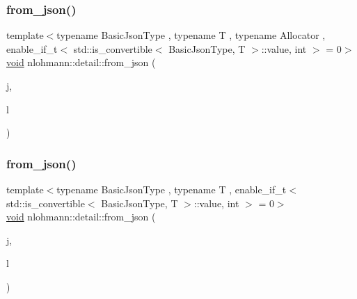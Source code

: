 \mbox{\label{namespacenlohmann_1_1detail_a5cfb765aad92795abd7fda29d017272a}} 
\subsubsection{\texorpdfstring{from\_json()}{from\_json()}\hspace{0.1cm}{\footnotesize\ttfamily [9/18]}}
{\footnotesize\ttfamily template$<$typename Basic\+Json\+Type , typename T , typename Allocator , enable\+\_\+if\+\_\+t$<$ std\+::is\+\_\+convertible$<$ Basic\+Json\+Type, T $>$\+::value, int $>$  = 0$>$ \\
\mbox{\hyperlink{namespacenlohmann_1_1detail_a59fca69799f6b9e366710cb9043aa77d}{void}} nlohmann\+::detail\+::from\+\_\+json (\begin{DoxyParamCaption}\item[{const Basic\+Json\+Type \&}]{j,  }\item[{std\+::forward\+\_\+list$<$ \mbox{\hyperlink{_keyboard_event_8h_adf1f3edb9115acb0a1e04209b7a9937b}{T}}, Allocator $>$ \&}]{l }\end{DoxyParamCaption})}

\mbox{\label{namespacenlohmann_1_1detail_a3df497b1d3977f071b488ecac1401517}} 
\subsubsection{\texorpdfstring{from\_json()}{from\_json()}\hspace{0.1cm}{\footnotesize\ttfamily [10/18]}}
{\footnotesize\ttfamily template$<$typename Basic\+Json\+Type , typename T , enable\+\_\+if\+\_\+t$<$ std\+::is\+\_\+convertible$<$ Basic\+Json\+Type, T $>$\+::value, int $>$  = 0$>$ \\
\mbox{\hyperlink{namespacenlohmann_1_1detail_a59fca69799f6b9e366710cb9043aa77d}{void}} nlohmann\+::detail\+::from\+\_\+json (\begin{DoxyParamCaption}\item[{const Basic\+Json\+Type \&}]{j,  }\item[{std\+::valarray$<$ \mbox{\hyperlink{_keyboard_event_8h_adf1f3edb9115acb0a1e04209b7a9937b}{T}} $>$ \&}]{l }\end{DoxyParamCaption})}

